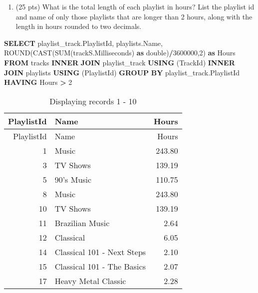 \documentclass[
]{article}
\newenvironment{Shaded}{\begin{snugshade}}{\end{snugshade}}
\newcommand{\DataTypeTok}[1]{\textcolor[rgb]{0.13,0.29,0.53}{#1}}
\newcommand{\DecValTok}[1]{\textcolor[rgb]{0.00,0.00,0.81}{#1}}
\newcommand{\FunctionTok}[1]{\textcolor[rgb]{0.00,0.00,0.00}{#1}}
\newcommand{\KeywordTok}[1]{\textcolor[rgb]{0.13,0.29,0.53}{\textbf{#1}}}
\newcommand{\NormalTok}[1]{#1}
\newcommand{\OperatorTok}[1]{\textcolor[rgb]{0.81,0.36,0.00}{\textbf{#1}}}
\providecommand{\tightlist}{%
  \setlength{\itemsep}{0pt}\setlength{\parskip}{0pt}}
\begin{document}
\begin{enumerate}
\def\labelenumi{\arabic{enumi}.}
\setcounter{enumi}{7}
\tightlist
\item
  (25 pts) What is the total length of each playlist in hours? List the
  playlist id and name of only those playlists that are longer than 2
  hours, along with the length in hours rounded to two decimals.
\end{enumerate}

\begin{Shaded}
\begin{Highlighting}[]

\KeywordTok{SELECT}\NormalTok{ playlist\_track.PlaylistId, playlists.Name, }\FunctionTok{ROUND}\NormalTok{(}\FunctionTok{CAST}\NormalTok{(}\FunctionTok{SUM}\NormalTok{(trackS.Milliseconds) }\KeywordTok{as} \DataTypeTok{double}\NormalTok{)}\OperatorTok{/}\DecValTok{3600000}\NormalTok{,}\DecValTok{2}\NormalTok{) }\KeywordTok{as}\NormalTok{ Hours}
\KeywordTok{FROM}\NormalTok{ tracks }\KeywordTok{INNER} \KeywordTok{JOIN}\NormalTok{ playlist\_track }\KeywordTok{USING}\NormalTok{ (TrackId)}
\KeywordTok{INNER} \KeywordTok{JOIN}\NormalTok{ playlists }\KeywordTok{USING}\NormalTok{ (PlaylistId)}
\KeywordTok{GROUP} \KeywordTok{BY}\NormalTok{ playlist\_track.PlaylistId}
\KeywordTok{HAVING}\NormalTok{ Hours }\OperatorTok{\textgreater{}} \DecValTok{2}
\end{Highlighting}
\end{Shaded}

\begin{longtable}[]{@{}rlr@{}}
\caption{Displaying records 1 - 10}\tabularnewline
\toprule
PlaylistId & Name & Hours \\
\midrule
\endfirsthead
\toprule
PlaylistId & Name & Hours \\
\midrule
\endhead
1 & Music & 243.80 \\
3 & TV Shows & 139.19 \\
5 & 90's Music & 110.75 \\
8 & Music & 243.80 \\
10 & TV Shows & 139.19 \\
11 & Brazilian Music & 2.64 \\
12 & Classical & 6.05 \\
14 & Classical 101 - Next Steps & 2.10 \\
15 & Classical 101 - The Basics & 2.07 \\
17 & Heavy Metal Classic & 2.28 \\
\bottomrule
\end{longtable}
\end{document}
